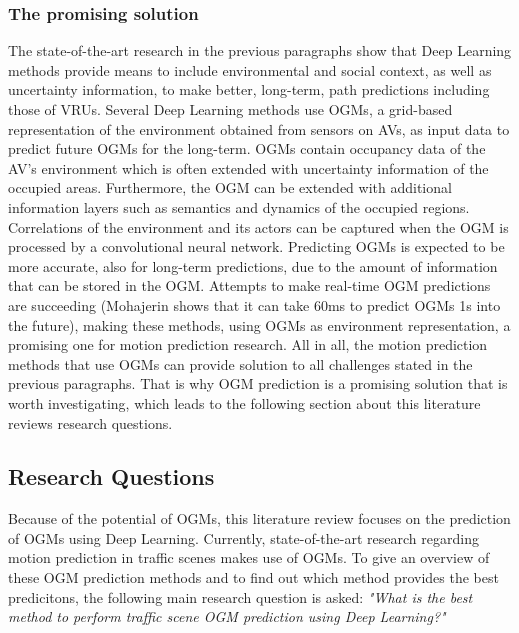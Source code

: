 \subsubsection{The promising solution}
The state-of-the-art research in the previous paragraphs show that Deep Learning methods provide means to include environmental and social context, as well as uncertainty information, to make better, long-term, path predictions including those of \glspl{VRU}. Several Deep Learning methods use \glspl{OGM}, a grid-based representation of the environment obtained from sensors on \glspl{AV}, as input data to predict future \glspl{OGM} for the long-term. \glspl{OGM} contain occupancy data of the \gls{AV}'s environment which is often extended with uncertainty information of the occupied areas. Furthermore, the \gls{OGM} can be extended with additional information layers such as semantics and dynamics of the occupied regions. Correlations of the environment and its actors can be captured when the \gls{OGM} is processed by a convolutional neural network. Predicting \glspl{OGM} is expected to be more accurate, also for long-term predictions, due to the amount of information that can be stored in the OGM. Attempts to make real-time \gls{OGM} predictions are succeeding (Mohajerin \cite{mohajerin2019multi} shows that it can take 60ms to predict \glspl{OGM} 1s into the future), making these methods, using \glspl{OGM} as environment representation, a promising one for motion prediction research. All in all, the motion prediction methods that use \glspl{OGM} can provide solution to all challenges stated in the previous paragraphs. That is why \gls{OGM} prediction is a promising solution that is worth investigating, which leads to the following section about this literature reviews research questions. \\


\subsection{Research Questions}
Because of the potential of \glspl{OGM}, this literature review focuses on the prediction of \glspl{OGM} using Deep Learning. Currently, state-of-the-art research regarding motion prediction in traffic scenes makes use of \glspl{OGM}. To give an overview of these \gls{OGM} prediction methods and to find out which method provides the best predicitons, the following main research question is asked: \textit{"What is the best method to perform traffic scene \gls{OGM} prediction using Deep Learning?"} \\

